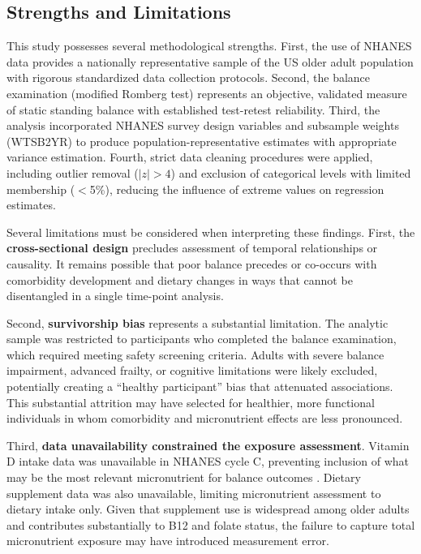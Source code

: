 \documentclass[11pt,a4paper]{article}
\begin{document}
\subsection{Strengths and Limitations}

This study possesses several methodological strengths. First, the use of NHANES data provides a nationally representative sample of the US older adult population with rigorous standardized data collection protocols. Second, the balance examination (modified Romberg test) represents an objective, validated measure of static standing balance with established test-retest reliability. Third, the analysis incorporated NHANES survey design variables and subsample weights (WTSB2YR) to produce population-representative estimates with appropriate variance estimation. Fourth, strict data cleaning procedures were applied, including outlier removal ($|z| > 4$) and exclusion of categorical levels with limited membership ($<$5\%), reducing the influence of extreme values on regression estimates.

Several limitations must be considered when interpreting these findings. First, the \textbf{cross-sectional design} precludes assessment of temporal relationships or causality. It remains possible that poor balance precedes or co-occurs with comorbidity development and dietary changes in ways that cannot be disentangled in a single time-point analysis.

Second, \textbf{survivorship bias} represents a substantial limitation. The analytic sample was restricted to participants who completed the balance examination, which required meeting safety screening criteria. Adults with severe balance impairment, advanced frailty, or cognitive limitations were likely excluded, potentially creating a ``healthy participant'' bias that attenuated associations. This substantial attrition may have selected for healthier, more functional individuals in whom comorbidity and micronutrient effects are less pronounced.

Third, \textbf{data unavailability constrained the exposure assessment}. Vitamin D intake data was unavailable in NHANES cycle C, preventing inclusion of what may be the most relevant micronutrient for balance outcomes \cite{orces2019_nhanes_vitd_disability, kalenkoski2020_nhanes_vitd_gait, moon2019_vitd_performance}. Dietary supplement data was also unavailable, limiting micronutrient assessment to dietary intake only. Given that supplement use is widespread among older adults and contributes substantially to B12 and folate status, the failure to capture total micronutrient exposure may have introduced measurement error.
\end{document}
